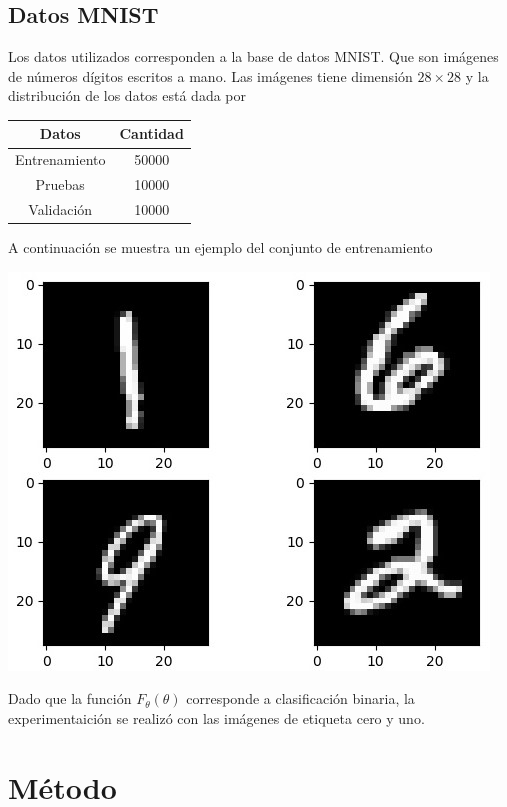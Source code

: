 \documentclass[11pt,letterpaper]{article}
\theoremstyle{definition}
\theoremstyle{definition}
\theoremstyle{definition}
\begin{document}
\subsection{Datos MNIST}
Los datos utilizados corresponden a la base de datos MNIST. Que son imágenes de números dígitos escritos a mano. Las imágenes tiene  dimensión $ 28 \times 28 $ y la distribución de los datos está dada por
\begin{center}
	\begin{tabular}{|c|c|}
	\hline
	Datos & Cantidad \\
	\hline
	Entrenamiento & 50000 \\
	\hline
	Pruebas & 10000 \\
	\hline
	Validación & 10000 \\
	\hline
\end{tabular}
\end{center}
A continuación se muestra un ejemplo del conjunto de entrenamiento
\begin{center}
	\includegraphics[width=0.8\linewidth]{graficas/example}
\end{center}
Dado que la función $ F_\theta (\theta) $ corresponde a clasificación binaria, la experimentaición se realizó con las imágenes de etiqueta cero y uno.

\section{Método}
\end{document}
